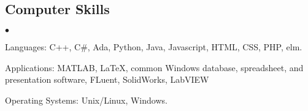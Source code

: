 \documentclass[margin,line]{res}
\newenvironment{list2}{
  \begin{list}{$\bullet$}{%
      \setlength{\itemsep}{0in}
      \setlength{\parsep}{0in} \setlength{\parskip}{0in}
      \setlength{\topsep}{0in} \setlength{\partopsep}{0in} 
      \setlength{\leftmargin}{0.2in}}}{\end{list}}
\begin{document}
\begin{resume}
\section{\sc Computer Skills} 
\begin{list2}
\item Languages:  C++, C\#, Ada, Python, Java, Javascript, HTML, CSS, PHP, elm.
\item Applications: MATLAB, \LaTeX, common Windows
  database, spreadsheet, and presentation software, FLuent, SolidWorks, LabVIEW
\item Operating Systems:  Unix/Linux, Windows.\\ 
\end{list2}



\end{resume}
\end{document}
